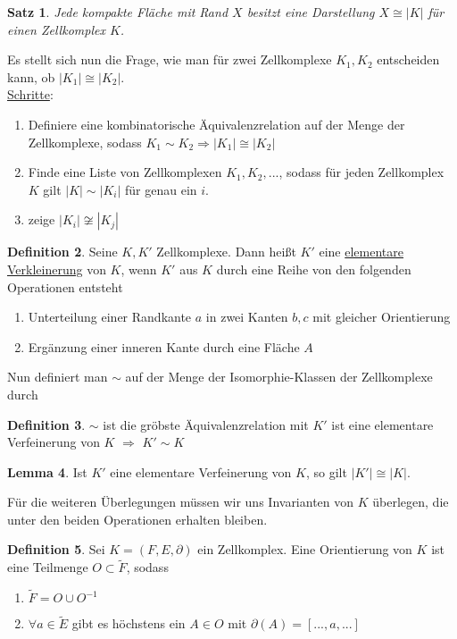 \documentclass[a4paper, 12pt]{article}
\theoremstyle{plain}
\newtheorem{theorem}{Satz}[section] %
\theoremstyle{definition}
\newtheorem{definition}[theorem]{Definition} %
\theoremstyle{lemma}
\newtheorem{lemma}[theorem]{Lemma}
\theoremstyle{remark}
\theoremstyle{corollary}
\theoremstyle{example}
\begin{document}
	\begin{theorem}
		Jede kompakte Fläche mit Rand $X$ besitzt eine Darstellung $X \cong \left|K\right|$ für einen Zellkomplex $K$.
	\end{theorem}
	Es stellt sich nun die Frage, wie man für zwei Zellkomplexe $K_1,K_2$ entscheiden kann, ob $\left|K_1\right| \cong \left|K_2\right|$.\\
	\underline{Schritte}: \begin{enumerate}
		\item Definiere eine kombinatorische Äquivalenzrelation auf der Menge der Zellkomplexe, sodass $K_1\sim K_2 \Rightarrow\left|K_1\right| \cong \left|K_2\right|$
		\item Finde eine Liste von Zellkomplexen $K_1,K_2,...$, sodass für jeden Zellkomplex $K$ gilt $\left|K\right| \sim \left|K_i\right|$ für genau ein $i$.
		\item zeige $\left|K_i\right| \not \cong \left|K_j\right|$
	\end{enumerate}
	\begin{definition}
		Seine $K,K'$ Zellkomplexe. Dann heißt $K'$ eine \underline{elementare Verkleinerung} von $K$, wenn $K'$ aus $K$ durch eine Reihe von den folgenden Operationen entsteht
		\begin{enumerate}
			\item Unterteilung einer Randkante $a$ in zwei Kanten $b,c$ mit gleicher Orientierung
			\item Ergänzung einer inneren Kante durch eine Fläche $A$
		\end{enumerate} 
	\end{definition}
	Nun definiert man $\sim$ auf der Menge der Isomorphie-Klassen der Zellkomplexe durch \begin{definition}
		$\sim$ ist die gröbste Äquivalenzrelation mit $K'$ ist eine elementare Verfeinerung von $K$ $\Rightarrow$ $K' \sim K$
	\end{definition}
	\begin{lemma}
		Ist $K'$ eine elementare Verfeinerung von $K$, so gilt $\left|K'\right| \cong \left|K\right|$.
	\end{lemma}
	Für die weiteren Überlegungen müssen wir uns Invarianten von $K$ überlegen, die unter den beiden Operationen erhalten bleiben.
	\begin{definition}
		Sei $K = (F,E,\partial)$ ein Zellkomplex. Eine Orientierung von $K$ ist eine Teilmenge $O\subset \tilde{F}$, sodass \begin{enumerate}
			\item $\tilde{F} = O \cup O^{-1}$
			\item $\forall a \in \tilde{E}$ gibt es höchstens ein $A \in O$ mit $\partial(A) = [...,a,...]$
		\end{enumerate}
	\end{definition}
\end{document}

